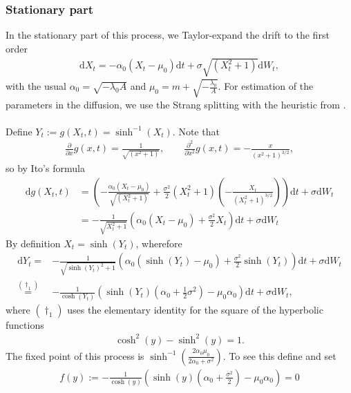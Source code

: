 \subsubsection{Stationary part}
In the stationary part of this process, we Taylor-expand the drift to the first order
\begin{align}
    \mathrm{d}X_t = -\alpha_0\left(X_t - \mu_0\right)\mathrm{d}t + \sigma \sqrt{\left(X_t^2 + 1\right)}\mathrm{d}W_t,
\end{align}
with the usual $\alpha_0 = \sqrt{-\lambda_0 A}$ and $\mu_0 = m + \sqrt{-\frac{\lambda_0}{A}}$.
For estimation of the parameters in the diffusion, we use the Strang splitting with the heuristic from \cite{SplittingSchemes}.\\\\
Define $Y_t := g(X_t , t) = \sinh^{-1}(X_t)$. Note that 
\begin{align}
    \frac{\partial}{\partial x}g(x, t) = \frac{1}{\sqrt{(x^2 + 1)}}, \qquad \frac{\partial^2}{\partial x^2}g(x, t) = -\frac{x}{\left(x^2 + 1\right)^{3/2}},
\end{align}
so by Ito's formula
\begin{align}
    \mathrm{d}g(X_t , t) &= \left(-\frac{\alpha_0\left(X_t - \mu_0\right)}{\sqrt{(X_t^2 + 1)}}+\frac{\sigma^2}{2}\left(X_t^2 + 1\right)\left(-\frac{X_t}{\left(X_t^2 + 1\right)^{3/2}}\right)\right)\mathrm{d}t + \sigma\mathrm{d}W_t\nonumber \\
    &= -\frac{1}{\sqrt{X_t^2 + 1}}\left(\alpha_0\left(X_t - \mu_0\right) + \frac{\sigma^2}{2}X_t\right)\mathrm{d}t + \sigma\mathrm{d}W_t
\end{align}
By definition $X_t = \sinh(Y_t)$, wherefore
\begin{align}
    \mathrm{d}Y_t =& -\frac{1}{\sqrt{\sinh(Y_t)^2 + 1}}\left(\alpha_0\left(\sinh(Y_t)- \mu_0\right) + \frac{\sigma^2}{2}\sinh(Y_t)\right)\mathrm{d}t + \sigma\mathrm{d}W_t \nonumber \\
    \overset{(\dagger_1)}{=}&- \frac{1}{\cosh(Y_t)}\left(\sinh(Y_t)\left(\alpha_0 + \frac{1}{2}\sigma^2\right) - \mu_0\alpha_0\right)\mathrm{d}t + \sigma \mathrm{d}W_t,
\end{align}
where $(\dagger_1)$ uses the elementary identity for the square of the hyperbolic functions
\begin{align*}
    \cosh^2(y) - \sinh^2(y) = 1.
\end{align*} 
The fixed point of this process is $\sinh^{-1}(\frac{2\alpha_0\mu_0}{2\alpha_0 + \sigma^2})$. To see this define and set
\begin{align}
    f(y) := -\frac{1}{\cosh(y)}\left(\sinh(y)\left(\alpha_0 + \frac{\sigma^2}{2}\right) - \mu_0\alpha_0\right) = 0
\end{align}
